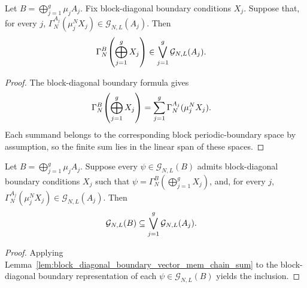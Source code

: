 \begin{lemma}
    \label{lem:block_diagonal_boundary_vector_mem_chain_sum}
    \leanok
    Let $B=\bigoplus_{j=1}^g\mu_jA_j$. Fix block-diagonal boundary conditions
    $X_j$. Suppose that, for every $j$,
    $\Gamma_N^{A_j}(\mu_j^N X_j)\in\mathcal G_{N,L}(A_j)$. Then
    \begin{align}
        \Gamma_N^B\!\left(\bigoplus_{j=1}^gX_j\right)
         & \in
        \bigvee_{j=1}^g\mathcal G_{N,L}(A_j).
        \notag
    \end{align}
\end{lemma}

\begin{proof}
    \leanok
    The block-diagonal boundary formula gives
    \begin{align}
        \Gamma_N^B\!\left(\bigoplus_{j=1}^gX_j\right)
         & =
        \sum_{j=1}^g\Gamma_N^{A_j}(\mu_j^N X_j).
        \notag
    \end{align}
    Each summand belongs to the corresponding block periodic-boundary space by
    assumption, so the finite sum lies in the linear span of these spaces.
\end{proof}

\begin{lemma}
    \label{lem:block_diagonal_boundary_representation_inclusion}
    \leanok
    Let $B=\bigoplus_{j=1}^g\mu_jA_j$. Suppose every
    $\psi\in\mathcal G_{N,L}(B)$ admits block-diagonal boundary conditions
    $X_j$ such that
    $\psi = \Gamma_N^B\!\left(\bigoplus_{j=1}^gX_j\right)$,
    and, for every $j$,
    $\Gamma_N^{A_j}(\mu_j^N X_j)\in\mathcal G_{N,L}(A_j)$. Then
    \begin{align}
        \mathcal G_{N,L}(B)
         & \subseteq
        \bigvee_{j=1}^g\mathcal G_{N,L}(A_j).
        \notag
    \end{align}
\end{lemma}

\begin{proof}
    \leanok
    Applying Lemma~\ref{lem:block_diagonal_boundary_vector_mem_chain_sum} to the
    block-diagonal boundary representation of each
    $\psi\in\mathcal G_{N,L}(B)$ yields the inclusion.
\end{proof}

